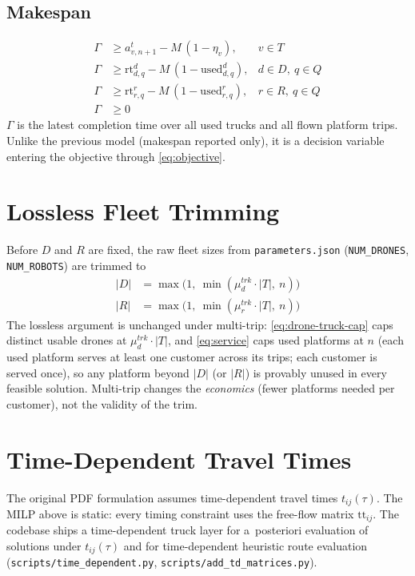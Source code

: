 \documentclass[10pt]{article}
\begin{document}
\subsection{Makespan}
\begin{align}
\Gamma &\ge a^t_{v,n+1} - M\,(1-\eta_v), & v\in T \label{eq:makespan-truck}\\
\Gamma &\ge \mathrm{rt}^d_{d,q} - M\,(1-\mathrm{used}^d_{d,q}), & d\in D,\ q\in Q \label{eq:makespan-drone}\\
\Gamma &\ge \mathrm{rt}^r_{r,q} - M\,(1-\mathrm{used}^r_{r,q}), & r\in R,\ q\in Q \label{eq:makespan-robot}\\
\Gamma &\ge 0 \label{eq:makespan-nonneg}
\end{align}
\noindent $\Gamma$ is the latest completion time over all used trucks and all
flown platform trips. Unlike the previous model (makespan reported only), it
is a decision variable entering the objective through \eqref{eq:objective}.

\section{Lossless Fleet Trimming}
\label{sec:trimming}

Before $D$ and $R$ are fixed, the raw fleet sizes from \texttt{parameters.json}
(\texttt{NUM\_DRONES}, \texttt{NUM\_ROBOTS}) are trimmed to
\begin{align}
|D| &= \max\big(1,\ \min(\mu^{trk}_d\cdot|T|,\ n)\big) \label{eq:trim-drone}\\
|R| &= \max\big(1,\ \min(\mu^{trk}_r\cdot|T|,\ n)\big) \label{eq:trim-robot}
\end{align}
\noindent The lossless argument is unchanged under multi-trip:
\eqref{eq:drone-truck-cap} caps distinct usable drones at
$\mu^{trk}_d\cdot|T|$, and \eqref{eq:service} caps used platforms at $n$ (each
used platform serves at least one customer across its trips; each customer is
served once), so any platform beyond $|D|$ (or $|R|$) is provably unused in
every feasible solution. Multi-trip changes the \emph{economics} (fewer
platforms needed per customer), not the validity of the trim.

\section{Time-Dependent Travel Times}
\label{sec:td}

The original PDF formulation assumes time-dependent travel times $t_{ij}(\tau)$.
The MILP above is static: every timing constraint uses the free-flow matrix
$\mathrm{tt}_{ij}$. The codebase ships a time-dependent truck layer for
a~posteriori evaluation of solutions under $t_{ij}(\tau)$ and for time-dependent
heuristic route evaluation (\texttt{scripts/time\_dependent.py},
\texttt{scripts/add\_td\_matrices.py}).
\end{document}
